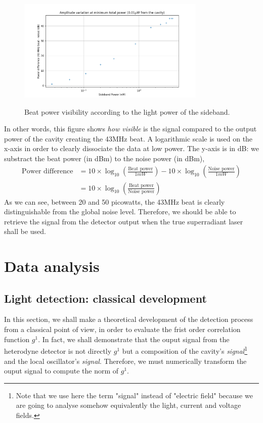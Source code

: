 \documentclass[11pt]{report}
\begin{document}
\begin{figure}[h!]
\caption{Beat power visibility according to the light power of the sideband.}
\centering
\includegraphics[width=0.8\textwidth]{sb-power-visibility}
\label{fig:sb-power-visibility}
\end{figure}

In other words, this figure shows \textit{how visible} is the signal compared to the output power of the cavity creating the 43MHz beat. A logarithmic scale is used on the x-axis in order to clearly dissociate the data at low power. The y-axis is in dB: we substract the beat power (in dBm) to the noise power (in dBm),
\begin{align}
\textrm{Power difference} &= 10 \times \log_{10}\left( \frac{\textrm{Beat power}}{1mW} \right) - 10 \times \log_{10}\left( \frac{\textrm{Noise power}}{1mW} \right) \\
&= 10 \times \log_{10}\left( \frac{\textrm{Beat power}}{\textrm{Noise power}} \right)
\end{align}
As we can see, between 20 and 50 picowatts, the 43MHz beat is clearly distinguishable from the global noise level. Therefore, we should be able to retrieve the signal from the detector output when the true superradiant laser shall be used.

\chapter{Data analysis}
\label{data_analysis_chapter}
\section{Light detection: classical development}

In this section, we shall make a theoretical development of the detection process from a classical point of view, in order to evaluate the frist order correlation function $g^1$. In fact, we shall demonstrate that the ouput signal from the heterodyne detector is not directly $g^1$ but a composition of the cavity's \textit{signal}\footnote{Note that we use here the term "signal" instead of "electric field" because we are going to analyse somehow equivalently the light, current and voltage fields.} and the local oscillator's \textit{signal}. Therefore, we must numerically transform the ouput signal to compute the norm of $g^1$.
\end{document}
